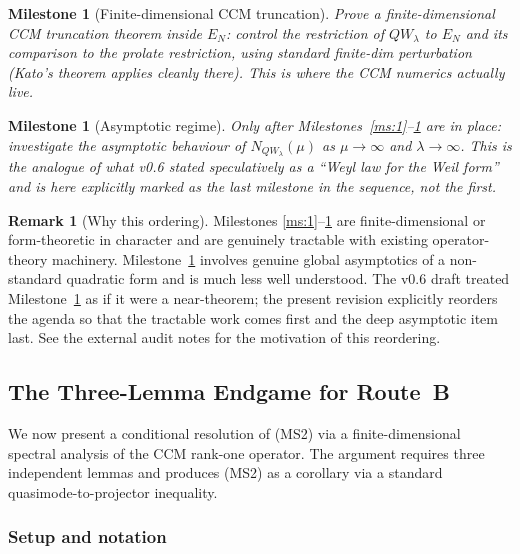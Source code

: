 \documentclass[11pt,a4paper]{article}
\theoremstyle{plain}
\newtheorem{milestone}[theorem]{Milestone}
\theoremstyle{definition}
\newtheorem{remark}[theorem]{Remark}
\begin{document}
\begin{milestone}[Finite-dimensional CCM truncation]
\label{ms:3}
Prove a finite-dimensional CCM truncation theorem inside $E_N$:
control the restriction of $QW_\lambda$ to $E_N$ and its comparison
to the prolate restriction, using standard finite-dim perturbation
(Kato's theorem applies cleanly there).  This is where the CCM
numerics actually live.
\end{milestone}

\begin{milestone}[Asymptotic regime]
\label{ms:4}
Only after Milestones~\ref{ms:1}--\ref{ms:3} are in place:
investigate the asymptotic behaviour of $N_{QW_\lambda}(\mu)$ as
$\mu \to \infty$ and $\lambda \to \infty$.  This is the analogue of
what v0.6 stated speculatively as a ``Weyl law for the Weil form''
and is here explicitly marked as the \emph{last} milestone in the
sequence, not the first.
\end{milestone}

\begin{remark}[Why this ordering]
\label{rem:milestone-ordering}
Milestones \ref{ms:1}--\ref{ms:3} are finite-dimensional or
form-theoretic in character and are genuinely tractable with
existing operator-theory machinery.  Milestone~\ref{ms:4} involves
genuine global asymptotics of a non-standard quadratic form and is
much less well understood.  The v0.6 draft treated Milestone~\ref{ms:4}
as if it were a near-theorem; the present revision explicitly reorders
the agenda so that the tractable work comes first and the deep
asymptotic item last.  See the external audit notes for the
motivation of this reordering.
\end{remark}

\subsection{The Three-Lemma Endgame for Route~B}
\label{sec:three-lemma-endgame}

We now present a conditional resolution of (MS2) via a
finite-dimensional spectral analysis of the CCM rank-one operator.
The argument requires three independent lemmas and produces (MS2) as
a corollary via a standard quasimode-to-projector inequality.

\subsubsection{Setup and notation}
\end{document}
